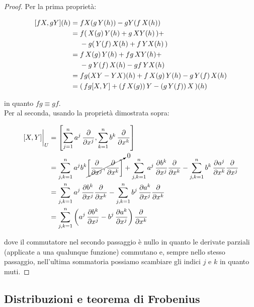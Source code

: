\begin{proof}
	Per la prima proprietà:
	
	\begin{align}
		\begin{split}
			[f X, g Y](h) &= f X(g \, Y(h)) - g Y(f \, X(h)) \\
			&= f ( \, X(g) \, Y(h) + g \, XY(h) \, ) + \\
			& \hal - g ( \, Y(f) \, X(h) + f \, YX(h) \, ) \\
			&= f \, X(g) \, Y(h) + f g \, XY(h) + \\
			& \hal - g \, Y(f) \, X(h) - g f \, YX(h) \\
			&= f g (XY-YX)(h) + f \, X(g) \, Y(h) - g \, Y(f) \, X(h) \\
			&= ( \, f g [X,Y] + (f \, X(g)) \, Y - (g \, Y(f)) \, X \, )(h)
		\end{split}
	\end{align}

	in quanto $ fg \equiv gf $. \\
	Per al seconda, usando la proprietà dimostrata sopra:
	
	\begin{align}
		\begin{split}
			\eval{[X,Y]}_{U} &= \left[ \sum_{j=1}^{n} a^{j} \, \pdv{x^{j}} , \sum_{k=1}^{n} b^{k} \, \pdv{x^{k}} \right] \\
			&= \sum_{j,k=1}^{n} a^{j} b^{k} \cancelto{0}{\left[ \pdv{x^{j}} , \pdv{x^{k}} \right]} + \sum_{j,k=1}^{n} a^{j} \, \pdv{b^{k}}{x^{j}} \pdv{x^{k}} - \sum_{j,k=1}^{n} b^{k} \, \pdv{a^{j}}{x^{k}} \pdv{x^{j}} \\
			&= \sum_{j,k=1}^{n} a^{j} \, \pdv{b^{k}}{x^{j}} \pdv{x^{k}} - \sum_{j,k=1}^{n} b^{j} \, \pdv{a^{k}}{x^{j}} \pdv{x^{k}} \\
			&= \sum_{j,k=1}^{n} \left( a^{j} \, \pdv{b^{k}}{x^{j}} - b^{j} \, \pdv{a^{k}}{x^{j}} \right) \pdv{x^{k}}
		\end{split}
	\end{align}

	dove il commutatore nel secondo passaggio è nullo in quanto le derivate parziali (applicate a una qualunque funzione) commutano e, sempre nello stesso passaggio, nell'ultima sommatoria possiamo scambiare gli indici $ j $ e $ k $ in quanto muti.
\end{proof}

\subsection{Distribuzioni e teorema di Frobenius}

